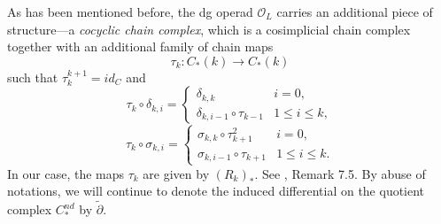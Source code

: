 \documentclass[a4paper]{article}
\numberwithin{equation}{section}
\begin{document}
As has been mentioned before, the dg operad $\mathcal{O}_L$ carries an additional piece of structure---a \textit{cocyclic chain complex}, which is a cosimplicial chain complex together with an additional family of chain maps
\begin{equation}
\tau_k:C_\ast(k)\rightarrow C_\ast(k)
\end{equation}
such that $\tau_k^{k+1}=\mathit{id}_C$ and
\begin{equation}\label{eq:td}
\tau_k\circ\delta_{k,i}=\left\{\begin{array}{ll}
\delta_{k,k} & i=0, \\ \delta_{k,i-1}\circ\tau_{k-1} & 1\leq i\leq k,
\end{array}\right.
\end{equation}
\begin{equation}\label{eq:cocy2}
\tau_k\circ\sigma_{k,i}=\left\{\begin{array}{ll}
\sigma_{k,k}\circ\tau_{k+1}^2 & i=0, \\ \sigma_{k,i-1}\circ\tau_{k+1} & 1\leq i\leq k.
\end{array}\right.
\end{equation}
In our case, the maps $\tau_k$ are given by $(R_k)_\ast$. See \cite{ki1}, Remark 7.5. By abuse of notations, we will continue to denote the induced differential on the quotient complex $C_\ast^\mathit{nd}$ by $\tilde{\partial}$.
\end{document}
